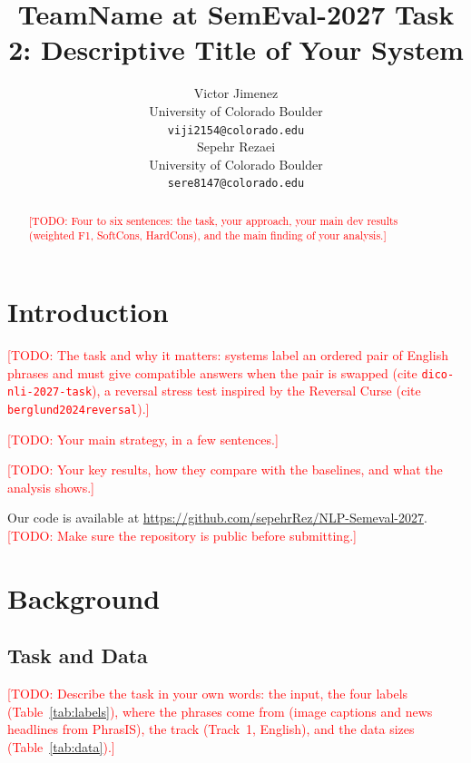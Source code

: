 \documentclass[11pt]{article}
\title{TeamName at SemEval-2027 Task 2: Descriptive Title of Your System}
\author{Victor Jimenez \\
  University of Colorado Boulder \\
  \texttt{viji2154@colorado.edu} \\\And
  Sepehr Rezaei \\
  University of Colorado Boulder \\
  \texttt{sere8147@colorado.edu} \\}
\newcommand{\todo}[1]{\textcolor{red}{[TODO: #1]}}
\begin{document}
\maketitle

\begin{abstract}
\todo{Four to six sentences: the task, your approach, your main dev results (weighted F1, SoftCons, HardCons), and the main finding of your analysis.}
\end{abstract}

\section{Introduction}

\todo{The task and why it matters: systems label an ordered pair of English phrases and must give compatible answers when the pair is swapped (cite \texttt{dico-nli-2027-task}), a reversal stress test inspired by the Reversal Curse (cite \texttt{berglund2024reversal}).}

\todo{Your main strategy, in a few sentences.}

\todo{Your key results, how they compare with the baselines, and what the analysis shows.}

Our code is available at \url{https://github.com/sepehrRez/NLP-Semeval-2027}.
\todo{Make sure the repository is public before submitting.}

\section{Background}

\subsection{Task and Data}

\todo{Describe the task in your own words: the input, the four labels (Table~\ref{tab:labels}), where the phrases come from (image captions and news headlines from PhrasIS), the track (Track~1, English), and the data sizes (Table~\ref{tab:data}).}
\end{document}
